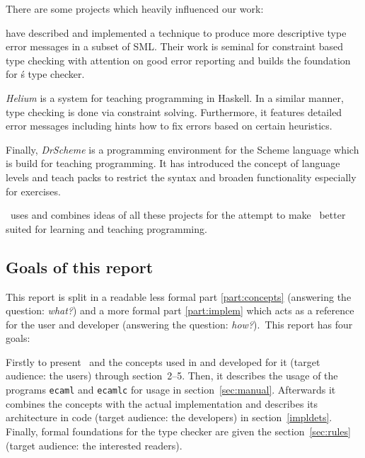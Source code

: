There are some projects which heavily influenced our work:

\citet{haackwells04} have described and implemented a technique 
to produce more descriptive type error messages in a subset of SML.  
Their work is seminal for constraint based type checking with attention 
on good error reporting and builds the foundation for \easyocaml\'s type 
checker.

\emph{Helium} \citep{helium-hw03} is a system for teaching programming 
in Haskell. In a similar manner, type checking is done via constraint 
solving. Furthermore, it features detailed error messages including 
hints how to fix errors based on certain heuristics.

Finally, \emph{DrScheme} \citep{Felleisen98thedrscheme} is a programming 
environment for the Scheme language which is build for teaching 
programming.  It has introduced the concept of language levels and teach 
packs to restrict the syntax and broaden functionality especially for 
exercises.

\easyocaml\ uses and combines ideas of all these projects for the attempt to
make \ocaml\ better suited for learning and teaching programming. \more


\subsection*{Goals of this report}

This report is split in a readable less formal part \ref{part:concepts}
(answering the question: \emph{what?}) and a more formal part \ref{part:implem}
which acts as a reference for the user and developer (answering the question:
\emph{how?}).\what\ This report has four goals:

Firstly to present \easyocaml\ and the concepts used in and developed for it
(target audience: the users) through section~2--5.
Then, it describes the usage of the programs \texttt{ecaml} and \texttt{ecamlc}
for usage in section~\ref{sec:manual}.
Afterwards it combines the concepts with the actual implementation and
describes its architecture in code (target audience: the developers) in
section~\ref{impldets}.
Finally, formal foundations for the type checker are given the section~\ref{sec:rules} (target
audience: the interested readers).
